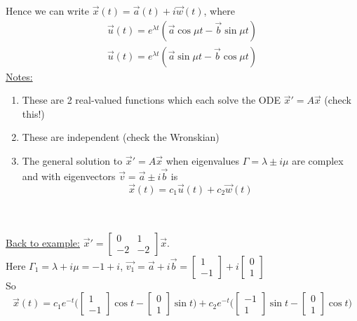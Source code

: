 Hence we can write $\vec{x}(t) = \vec{a}(t) + i \vec{w}(t)$, where
\begin{gather*}
	\vec{u}(t) = e^{\lambda t}(\vec{a} \cos \mu t - \vec{b} \sin \mu t)\\
	\vec{u}(t) = e^{\lambda t}(\vec{a} \sin \mu t - \vec{b} \cos \mu t)
\end{gather*}
\underline{Notes: }
\begin{enumerate}[label=\protect\circled{\arabic*}]
	\item These are 2 real-valued functions which each solve the ODE $\vec{x}' = A \vec{x}$ (check this!)
	\item These are independent (check the Wronskian)
	\item The general solution to $\vec{x}' = A\vec{x}$ when eigenvalues $\Gamma = \lambda \pm i \mu$ are complex and with eigenvectors $\vec{v} = \vec{a} \pm i \vec{b}$ is 
\begin{equation*}
	\vec{x}(t) = c_1 \vec{u}(t) + c_2 \vec{w}(t)
\end{equation*}
\end{enumerate}
\redhline\\\\
\underline{Back to example:} $\vec{x}' = \begin{bmatrix}
	0 & 1\\
	-2 & -2
\end{bmatrix} \vec{x}$.\\
Here $\Gamma_1 = \lambda + i \mu = -1 + i$, $\vec{v_1} = \vec{a} + i \vec{b} = \begin{bmatrix}
	1\\-1
\end{bmatrix} + i \begin{bmatrix}
	0\\1
\end{bmatrix}$\\ So\\
\begin{equation*}
	\vec{x}(t) = c_1 e^{-t} \bigg( \begin{bmatrix}
		1\\ -1
	\end{bmatrix} \cos t - \begin{bmatrix}
		0\\1
	\end{bmatrix} \sin t \bigg) + c_2 e^{-t} \bigg( \begin{bmatrix}
		-1\\ 1
	\end{bmatrix} \sin t - \begin{bmatrix}
		0\\1
	\end{bmatrix} \cos t \bigg) 
\end{equation*}